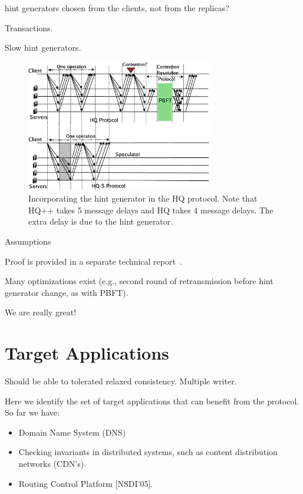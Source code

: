 \documentclass[twocolumn,10pt]{article}
\begin{document}
hint generators chosen from the clients, not from the replicas?

Transactions.

Slow hint generators.


\begin{figure}
\centering
\includegraphics[width=3.2in]{hq++.eps}
\caption{Incorporating the hint generator in the HQ protocol. Note that HQ++
takes 5 message delays and HQ takes 4 message delays.  The extra delay is
due to the hint generator.}
\label{fig:hq++}
\end{figure}

Assumptions

Proof is provided in a separate technical report~\cite{}.

Many optimizations exist (e.g., second round of retransmission before
hint generator change, as with PBFT).



We are really great!


\fi





\section{Target Applications}
\label{sec:applications}

 Should be able to tolerated relaxed consistency.
Multiple writer. 

Here we identify the set of target applications that can benefit from the \bihq
protocol. So far we have:
\begin{itemize}
\item{} Domain Name System (DNS)
\item{} Checking invariants in distributed systems, such as content distribution networks (CDN's).
\item{} Routing Control Platform [NSDI'05]. 
\end{itemize}
\end{document}

